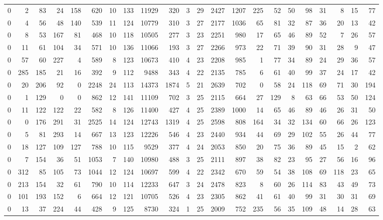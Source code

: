 {\begin{landscape}
\begin{longtable}[c]{lrrrrrrrrrrrrrrrrrrrrr}
0 & 2 & 83 & 24 & 158 & 620 & 10 & 133 & 11929 & 320 & 3 & 29 & 2427 & 1207 & 225 & 52 & 50 & 98 & 31 & 8 & 15 & 77 \\
0 & 4 & 56 & 48 & 140 & 539 & 11 & 124 & 10779 & 310 & 3 & 27 & 2177 & 1036 & 65 & 81 & 32 & 87 & 36 & 20 & 13 & 42 \\
0 & 8 & 53 & 167 & 81 & 468 & 10 & 118 & 10505 & 277 & 3 & 23 & 2251 & 980 & 17 & 65 & 46 & 89 & 52 & 7 & 26 & 57 \\
0 & 11 & 61 & 104 & 34 & 571 & 10 & 136 & 11066 & 193 & 3 & 27 & 2266 & 973 & 22 & 71 & 39 & 90 & 31 & 28 & 9 & 47 \\
0 & 57 & 60 & 227 & 4 & 589 & 8 & 123 & 10673 & 410 & 4 & 23 & 2208 & 985 & 1 & 77 & 34 & 89 & 24 & 29 & 36 & 57 \\
0 & 285 & 185 & 21 & 16 & 392 & 9 & 112 & 9488 & 343 & 4 & 22 & 2135 & 785 & 6 & 61 & 40 & 99 & 37 & 24 & 17 & 42 \\
0 & 20 & 206 & 92 & 0 & 2248 & 24 & 113 & 14373 & 1874 & 5 & 21 & 2639 & 702 & 0 & 58 & 24 & 118 & 69 & 71 & 30 & 194 \\
0 & 1 & 129 & 0 & 0 & 862 & 12 & 141 & 11109 & 702 & 3 & 25 & 2115 & 664 & 27 & 129 & 8 & 63 & 66 & 53 & 50 & 124 \\
0 & 11 & 122 & 122 & 22 & 582 & 8 & 126 & 11400 & 427 & 4 & 25 & 2389 & 1000 & 14 & 65 & 46 & 89 & 46 & 26 & 31 & 50 \\
0 & 0 & 176 & 291 & 31 & 2525 & 14 & 124 & 12743 & 1319 & 4 & 25 & 2598 & 808 & 164 & 34 & 32 & 134 & 60 & 66 & 26 & 123 \\
0 & 5 & 81 & 293 & 14 & 667 & 13 & 123 & 12226 & 546 & 4 & 23 & 2440 & 934 & 44 & 69 & 29 & 102 & 55 & 26 & 44 & 77 \\
0 & 18 & 127 & 109 & 127 & 788 & 10 & 115 & 9529 & 377 & 4 & 24 & 2053 & 850 & 20 & 75 & 36 & 89 & 45 & 15 & 2 & 62 \\
0 & 7 & 154 & 36 & 51 & 1053 & 7 & 140 & 10980 & 488 & 3 & 25 & 2111 & 897 & 38 & 82 & 23 & 95 & 27 & 56 & 16 & 96 \\
0 & 312 & 85 & 105 & 73 & 1044 & 12 & 124 & 10697 & 599 & 4 & 22 & 2342 & 670 & 59 & 54 & 38 & 108 & 69 & 118 & 23 & 65 \\
0 & 213 & 154 & 32 & 61 & 790 & 10 & 114 & 12233 & 647 & 3 & 24 & 2478 & 823 & 8 & 60 & 26 & 114 & 83 & 43 & 49 & 73 \\
0 & 101 & 193 & 152 & 6 & 664 & 12 & 121 & 10705 & 526 & 4 & 23 & 2305 & 862 & 41 & 61 & 40 & 99 & 31 & 30 & 31 & 69 \\
0 & 13 & 37 & 224 & 44 & 428 & 9 & 125 & 8730 & 324 & 1 & 25 & 2009 & 752 & 235 & 56 & 35 & 109 & 48 & 14 & 28 & 63 \\

\end{longtable}
\end{landscape}}
